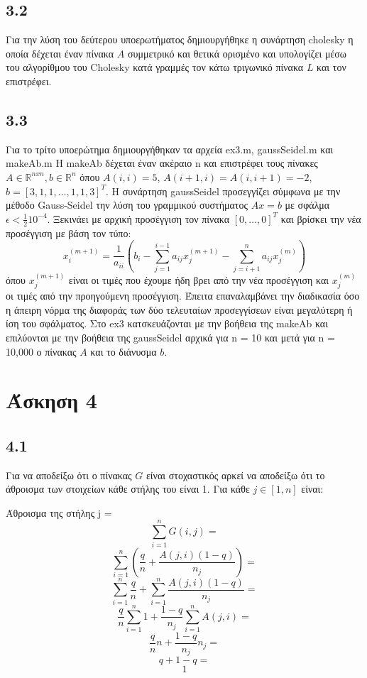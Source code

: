 \documentclass[a4paper,11pt]{article}
\begin{document}
\begin{flushleft}
\subsection*{3.2}
Για την λύση του δεύτερου υποερωτήματος δημιουργήθηκε η συνάρτηση cholesky η οποία δέχεται έναν πίνακα $A$ συμμετρικό και θετικά ορισμένο και υπολογίζει μέσω του αλγορίθμου του Cholesky κατά γραμμές τον κάτω τριγωνικό πίνακα $L$ και τον επιστρέφει.
\newline

\subsection*{3.3}
Για το τρίτο υποερώτημα δημιουργήθηκαν τα αρχεία ex3.m, gaussSeidel.m και makeAb.m
\newline
Η makeAb δέχεται έναν ακέραιο n και επιστρέφει τους πίνακες $A\in\mathbb{R}^{nxn} ,b\in\mathbb{R}^n$ όπου $A(i,i) = 5$, $A(i+1,i) = A(i,i+1) = -2$, $b = [3,1,1,\dots,1,1,3]^T$. \newline
Η συνάρτηση gaussSeidel προσεγγίζει σύμφωνα με την μέθοδο Gauss-Seidel την λύση του γραμμικού συστήματος $Ax=b$ με σφάλμα $\epsilon < \frac{1}{2}10^{-4}$.
Ξεκινάει με αρχική προσέγγιση τον πίνακα $[0,\dots,0]^T$ και βρίσκει την νέα προσέγγιση με βάση τον τύπο: $$x_i^{(m+1)}=\frac{1}{a_{ii}}(b_i-\sum_{j=1}^{i-1}a_{ij}x_j^{(m+1)}-\sum_{j=i+1}^na_{ij}x_j^{(m)})$$ 
όπου $x_j^{(m+1)}$ είναι οι τιμές που έχουμε ήδη βρει από την νέα προσέγγιση και $x_j^{(m)}$ οι τιμές από την προηγούμενη προσέγγιση.\newline
Έπειτα επαναλαμβάνει την διαδικασία όσο η άπειρη νόρμα της διαφοράς των δύο τελευταίων προσεγγίσεων είναι μεγαλύτερη ή ίση του σφάλματος.\newline
Στο ex3 κατσκευάζονται με την βοήθεια της makeAb και επιλύονται με την βοήθεια της gaussSeidel αρχικά για n = 10 και μετά για n = 10,000 ο πίνακας $A$ και το διάνυσμα $b$.
\newpage

\section*{Άσκηση 4}

\subsection*{4.1}
Για να αποδείξω ότι ο πίνακας $G$ είναι στοχαστικός αρκεί να αποδείξω ότι το άθροισμα των στοιχείων κάθε στήλης του είναι 1.\newline
Για κάθε $j\in [1,n]$ είναι:
\begin{center}
    Άθροισμα της στήλης j = $$\sum_{i=1}^nG(i,j)=$$ 
    $$\sum_{i=1}^n(\frac{q}{n}+\frac{A(j,i)(1-q)}{n_j})=$$
    $$\sum_{i=1}^n\frac{q}{n}+\sum_{i=1}^n\frac{A(j,i)(1-q)}{n_j}=$$
    $$\frac{q}{n}\sum_{i=1}^n1+\frac{1-q}{n_j}\sum_{i=1}^nA(j,i)=$$
    $$\frac{q}{n}n+\frac{1-q}{n_j}n_j=$$
    $$q+1-q=$$
    $$1$$
\end{center}


\end{flushleft}
\end{document}
